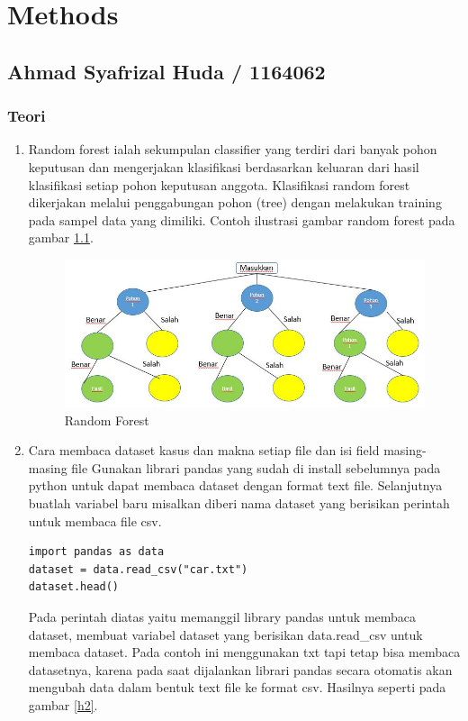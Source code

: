 \chapter{Methods}

\section{Ahmad Syafrizal Huda / 1164062}
\subsection{Teori}
\begin{enumerate}
\item Random forest ialah sekumpulan classifier yang terdiri dari banyak pohon keputusan dan mengerjakan klasifikasi berdasarkan keluaran dari hasil klasifikasi setiap pohon keputusan anggota. Klasifikasi random forest dikerjakan melalui penggabungan pohon (tree) dengan melakukan training pada sampel data yang dimiliki. Contoh ilustrasi gambar random forest pada gambar \ref{h1}.
\begin{figure}[!htbp]
	\centerline{\includegraphics[width=1\textwidth]{figures/huda/chapter3/1.JPG}}
	\caption{Random Forest}
	\label{h1}
\end{figure}
\item Cara membaca dataset kasus dan makna setiap file dan isi field masing-masing file
\subitem Gunakan librari pandas yang sudah di install sebelumnya pada python untuk dapat membaca dataset dengan format text file.
\subitem  Selanjutnya buatlah variabel baru misalkan diberi nama dataset yang berisikan perintah untuk membaca file csv.
\begin{verbatim}
import pandas as data
dataset = data.read_csv("car.txt")
dataset.head()
\end{verbatim}
\subitem Pada perintah diatas yaitu memanggil library pandas untuk membaca dataset, membuat variabel dataset yang berisikan data.read\_csv untuk membaca dataset. Pada contoh ini menggunakan txt tapi tetap bisa membaca datasetnya, karena pada saat dijalankan librari pandas secara otomatis akan mengubah data dalam bentuk text file ke format csv. Hasilnya seperti pada gambar \ref{h2}.

\end{enumerate}

